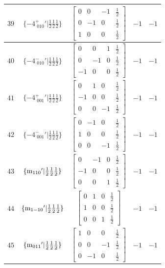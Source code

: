 \documentclass[fleqn,8pt]{jsarticle}
\begin{document}
\begin{longtable}{ccccc}
$ 39 $ & $ \{-4^{+}_{\,\,010}{}'|\frac{1}{2} \frac{1}{2} \frac{1}{2}\} $ & $ \begin{bmatrix} 0 & 0 & -1 & \frac{1}{2} \\ 0 & -1 & 0 & \frac{1}{2} \\ 1 & 0 & 0 & \frac{1}{2} \end{bmatrix} $ & $ -1 $ & $ -1 $ \\ \hline
$ 40 $ & $ \{-4^{-}_{\,\,010}{}'|\frac{1}{2} \frac{1}{2} \frac{1}{2}\} $ & $ \begin{bmatrix} 0 & 0 & 1 & \frac{1}{2} \\ 0 & -1 & 0 & \frac{1}{2} \\ -1 & 0 & 0 & \frac{1}{2} \end{bmatrix} $ & $ -1 $ & $ -1 $ \\ \hline
$ 41 $ & $ \{-4^{+}_{\,\,001}{}'|\frac{1}{2} \frac{1}{2} \frac{1}{2}\} $ & $ \begin{bmatrix} 0 & 1 & 0 & \frac{1}{2} \\ -1 & 0 & 0 & \frac{1}{2} \\ 0 & 0 & -1 & \frac{1}{2} \end{bmatrix} $ & $ -1 $ & $ -1 $ \\ \hline
$ 42 $ & $ \{-4^{-}_{\,\,001}{}'|\frac{1}{2} \frac{1}{2} \frac{1}{2}\} $ & $ \begin{bmatrix} 0 & -1 & 0 & \frac{1}{2} \\ 1 & 0 & 0 & \frac{1}{2} \\ 0 & 0 & -1 & \frac{1}{2} \end{bmatrix} $ & $ -1 $ & $ -1 $ \\ \hline
$ 43 $ & $ \{{\rm m}_{110}{}'|\frac{1}{2} \frac{1}{2} \frac{1}{2}\} $ & $ \begin{bmatrix} 0 & -1 & 0 & \frac{1}{2} \\ -1 & 0 & 0 & \frac{1}{2} \\ 0 & 0 & 1 & \frac{1}{2} \end{bmatrix} $ & $ -1 $ & $ -1 $ \\ \hline
$ 44 $ & $ \{{\rm m}_{1-10}{}'|\frac{1}{2} \frac{1}{2} \frac{1}{2}\} $ & $ \begin{bmatrix} 0 & 1 & 0 & \frac{1}{2} \\ 1 & 0 & 0 & \frac{1}{2} \\ 0 & 0 & 1 & \frac{1}{2} \end{bmatrix} $ & $ -1 $ & $ -1 $ \\ \hline
$ 45 $ & $ \{{\rm m}_{011}{}'|\frac{1}{2} \frac{1}{2} \frac{1}{2}\} $ & $ \begin{bmatrix} 1 & 0 & 0 & \frac{1}{2} \\ 0 & 0 & -1 & \frac{1}{2} \\ 0 & -1 & 0 & \frac{1}{2} \end{bmatrix} $ & $ -1 $ & $ -1 $ \\ \hline

\end{longtable}
\end{document}
